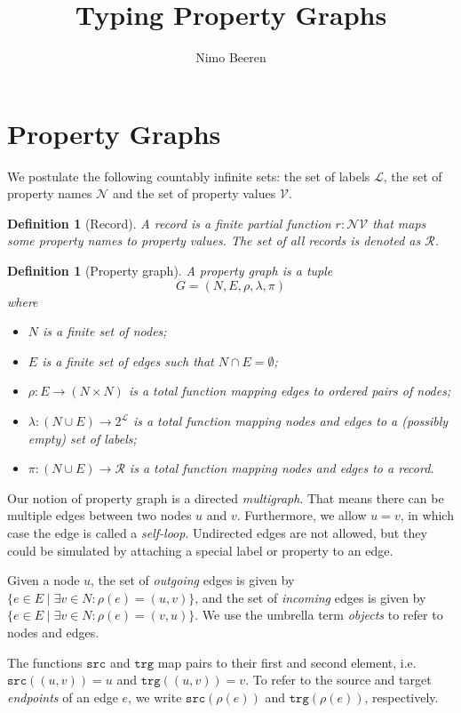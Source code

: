 \documentclass[a4paper]{article}
\title{Typing Property Graphs}
\author{Nimo Beeren}
\makeatletter
\newtheorem{definition}[theorem]{Definition}
\newcommand{\pto}{}%
\DeclareRobustCommand{\pto}{\mathrel{\mathpalette\p@to@gets\to}}
\newcommand{\p@to@gets}[2]{%
  \ooalign{\hidewidth$\m@th#1\mapstochar\mkern5mu$\hidewidth\cr$\m@th#1\to$\cr}%
}
\newcommand{\src}{\mathtt{src}}
\newcommand{\trg}{\mathtt{trg}}
\makeatother
\begin{document}
\section{Property Graphs}

We postulate the following countably infinite sets: the set of labels $\mathcal{L}$, the set of property names $\mathcal{N}$ and the set of property values $\mathcal{V}$.

\begin{definition}[Record]
  A \emph{record} is a finite partial function $r : \mathcal{N} \pto \mathcal{V}$ that maps some property names to property values. The set of all records is denoted as $\mathcal{R}$.
\end{definition}

\begin{definition}[Property graph]
  A \emph{property graph} is a tuple $$G = (N, E, \rho, \lambda, \pi)$$ where
  \begin{itemize}
    \item $N$ is a finite set of nodes;
    \item $E$ is a finite set of edges such that $N \cap E = \emptyset$;
    \item $\rho : E \to (N \times N)$ is a total function mapping edges to ordered pairs of nodes;
    \item $\lambda : (N \cup E) \to 2^{\mathcal{L}}$ is a total function mapping nodes and edges to a (possibly empty) set of labels;
    \item $\pi : (N \cup E) \to \mathcal{R}$ is a total function mapping nodes and edges to a record.
  \end{itemize}
\end{definition}

Our notion of property graph is a directed \emph{multigraph}. That means there can be multiple edges between two nodes $u$ and $v$. Furthermore, we allow $u = v$, in which case the edge is called a \emph{self-loop}. Undirected edges are not allowed, but they could be simulated by attaching a special label or property to an edge.

Given a node $u$, the set of \emph{outgoing} edges is given by $\{e \in E \mid \exists v \in N : \rho(e) = (u, v)\}$, and the set of \emph{incoming} edges is given by $\{e \in E \mid \exists v \in N : \rho(e) = (v, u)\}$. We use the umbrella term \emph{objects} to refer to nodes and edges.

The functions $\src$ and $\trg$ map pairs to their first and second element, i.e. $\src((u, v)) = u$ and $\trg((u, v)) = v$. To refer to the source and target \emph{endpoints} of an edge $e$, we write $\src(\rho(e))$ and $\trg(\rho(e))$, respectively.
\end{document}
